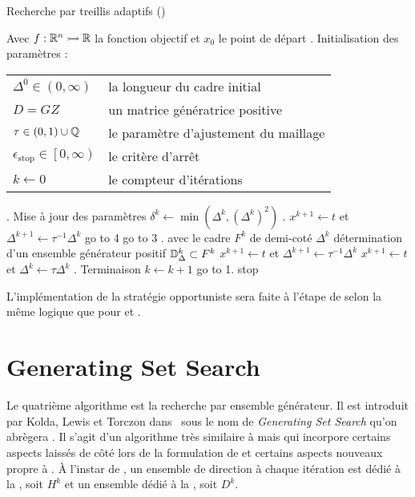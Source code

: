 \begin{algorithm}[H]
	\caption{\textsf{Recherche par treillis adaptifs} (\MADS)}
	\label{alg:mad}
	\begin{algorithmic}
		\STATE Avec $f:\mathbb{R}^n \rightarrowtail \mathbb{R}$ la fonction objectif et $x_0$ le point de départ
		. \textsf{Initialisation des paramètres} : 
		\bindent
		\STATE\begin{flushleft}
			\begin{tabular}{l l}
				$\Delta^0 \in (0,\infty)$ & la longueur du cadre initial\\
				$D=GZ$ & un matrice génératrice positive\\
				$\tau \in (0,1) \cup \mathbb{Q}$ & le paramètre d'ajustement du maillage\\
				$\epsilon_{\text{stop}} \in \left[ 0,\infty \right) $ & le critère d'arrêt\\
				$k \leftarrow 0$ & le compteur d'itérations\\
			\end{tabular}
		\end{flushleft}
		\eindent
		. \textsf{Mise à jour des paramètres}
		\bindent
		\STATE $\delta^k \leftarrow \min(\Delta^k,(\Delta^k)^2)$
		\eindent
		. \SEARCH
		\bindent
		\STATE $x^{k+1} \leftarrow t$ et $\Delta^{k+1} \leftarrow \tau ^{-1}\Delta^k$
		\STATE go to 4
		\ELSE
		\STATE go to 3
		\ENDIF
		\eindent
		. \POLL
		\bindent
		\STATE avec le cadre $F^k$ de demi-coté $\Delta^k$
		\STATE détermination d'un ensemble générateur positif $\mathbb{D}^k_\Delta \subset F^k$
		\STATE $x^{k+1} \leftarrow t$ et $\Delta^{k+1} \leftarrow \tau ^{-1}\Delta^k$
		\ELSE
		\STATE $x^{k+1} \leftarrow t$ et $\Delta^{k} \leftarrow \tau\Delta^k$
		\ENDIF
		\eindent
		. \textsf{Terminaison}
		\bindent
		\STATE $k\leftarrow k+1$
		\STATE go to 1.
		\ELSE
		\STATE stop
		\ENDIF
		\eindent
	\end{algorithmic}
\end{algorithm}
L'implémentation de la stratégie opportuniste sera faite à l'étape de \POLL selon la même logique que pour \CS et \GPS. 
\section{Generating Set Search}\label{sec:gss}
Le quatrième algorithme est la recherche par ensemble générateur. Il est introduit par Kolda, Lewis et Torczon dans~\cite{KoLeTo03a} sous le nom de \textit{Generating Set Search} qu'on abrègera \GSS. Il s'agit d'un algorithme très similaire à \GPS mais qui incorpore certains aspects laissés de côté lors de la formulation de \GPS et certains aspects nouveaux propre à \GSS. À l'instar de \GSS, un ensemble de direction à chaque itération est dédié à la \SEARCH, soit $H^k$ et un ensemble dédié à la \POLL, soit $D^k$.

